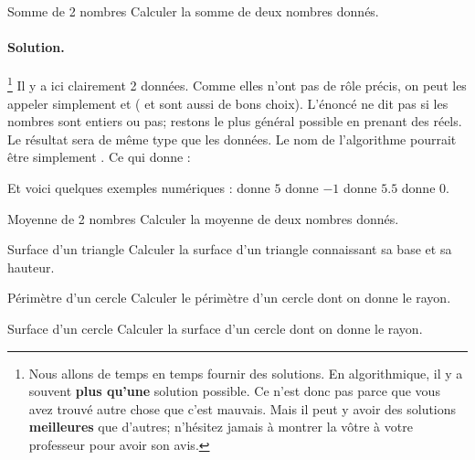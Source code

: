 		\begin{Exercice}{Somme de 2 nombres}
			Calculer la somme de deux nombres donnés.
			\paragraph{Solution.}%
			\footnote{%
				Nous allons de temps en temps 
				fournir des solutions.
				En algorithmique,
				il y a souvent \textbf{plus qu'une} solution possible.
				Ce n'est donc pas parce que vous avez trouvé autre chose
				que c'est mauvais.
				Mais il peut y avoir des solutions \textbf{meilleures}
				que d'autres; 
				n'hésitez jamais à montrer la vôtre
				à votre professeur pour avoir son avis.
			}
			Il y a ici clairement 2 données.
			Comme elles n'ont pas de rôle précis,
			on peut les appeler simplement 
			et 
			( et  sont aussi de bons choix).
			L'énoncé ne dit pas si les nombres sont entiers ou pas;
			restons le plus général possible en prenant des réels.
			Le résultat sera de même type que les données.
			Le nom de l'algorithme pourrait être simplement .
			Ce qui donne :
			\begin{center}
			\end{center}			 
			Et voici quelques exemples numériques :	
				 donne $5$      \quad
				 donne $-1$    \quad
				 donne $5.5$  \quad
				 donne $0$.
		\end{Exercice}
	
		\begin{Exercice}{Moyenne de 2 nombres}
			Calculer la moyenne de deux nombres donnés.
		\end{Exercice}
		
		\begin{Exercice}{Surface d’un triangle}
			Calculer la surface d’un triangle connaissant sa base et sa hauteur.
		\end{Exercice}
	
		\begin{Exercice}{Périmètre d’un cercle}
			Calculer le périmètre d’un cercle dont on donne le rayon. 
		\end{Exercice}
	
		\begin{Exercice}{Surface d’un cercle}
			Calculer la surface d’un cercle dont on donne le rayon. 
		\end{Exercice}
	
